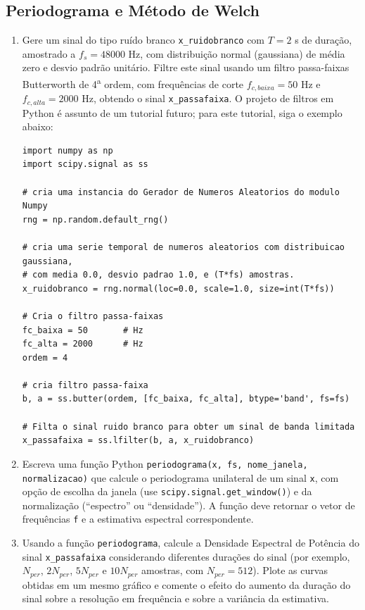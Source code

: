 \documentclass[a4paper,twoside,12pt]{article}
\begin{document}
	\subsection{Periodograma e Método de Welch}
	\begin{enumerate}
		\item Gere um sinal do tipo ruído branco {\tt x\_ruidobranco} com $T = 2$ s de duração, amostrado a $f_s = 48000$ Hz, com distribuição normal (gaussiana) de média zero e desvio padrão unitário. Filtre este sinal usando um filtro passa-faixas Butterworth de 4\textsuperscript{a} ordem, com frequências de corte $f_{c,baixa} = 50$ Hz e $f_{c,alta} = 2000$ Hz, obtendo o sinal {\tt x\_passafaixa}. O projeto de filtros em Python é assunto de um tutorial futuro; para este tutorial, siga o exemplo abaixo:
		
		
		\begin{lstlisting}[frame=single]
import numpy as np
import scipy.signal as ss

# cria uma instancia do Gerador de Numeros Aleatorios do modulo Numpy
rng = np.random.default_rng()

# cria uma serie temporal de numeros aleatorios com distribuicao gaussiana,
# com media 0.0, desvio padrao 1.0, e (T*fs) amostras.
x_ruidobranco = rng.normal(loc=0.0, scale=1.0, size=int(T*fs))

# Cria o filtro passa-faixas
fc_baixa = 50  		# Hz
fc_alta = 2000  	# Hz
ordem = 4

# cria filtro passa-faixa
b, a = ss.butter(ordem, [fc_baixa, fc_alta], btype='band', fs=fs)

# Filta o sinal ruido branco para obter um sinal de banda limitada
x_passafaixa = ss.lfilter(b, a, x_ruidobranco)
		\end{lstlisting}
		
		\item Escreva uma função Python {\tt periodograma(x, fs, nome\_janela, normalizacao)} que calcule o periodograma unilateral de um sinal {\tt x}, com opção de escolha da janela (use {\tt scipy.signal.get\_window()}) e da normalização (``espectro'' ou ``densidade''). A função deve retornar o vetor de frequências {\tt f} e a estimativa espectral correspondente.
		
		\item Usando a função {\tt periodograma}, calcule a Densidade Espectral de Potência do sinal {\tt x\_passafaixa} considerando diferentes durações do sinal (por exemplo, $N_{per}$, $2 N_{per}$, $5 N_{per}$ e $10 N_{per}$ amostras, com $N_{per} = 512$). Plote as curvas obtidas em um mesmo gráfico e comente o efeito do aumento da duração do sinal sobre a resolução em frequência e sobre a variância da estimativa.
		

\end{enumerate}
\end{document}
